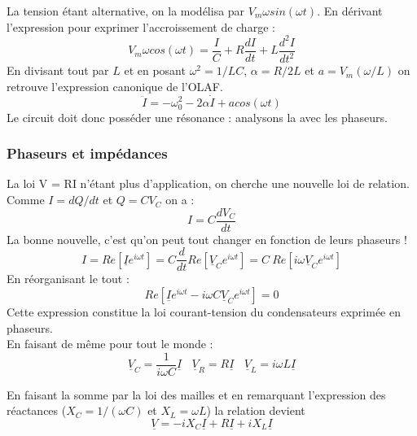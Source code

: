 \documentclass	[11pt, a4paper, openany]{book}
\begin{document}
	La tension étant alternative, on la modélisa par $V_m\omega sin(\omega t)$. En dérivant l'expression pour exprimer l'accroissement de charge : 
	\begin{equation}
		V_m\omega cos(\omega t) = \frac{I}{C} + R\frac{dI}{dt} + L\frac{d^2I}{dt^2}
	\end{equation}
	En divisant tout par $L$ et en posant $\omega^2 = 1/LC$, $\alpha = R/2L$ et $a = V_m(\omega/L)$ on retrouve l'expression canonique de l'OLAF.
	\begin{equation}
		\ddot{I} = -\omega_0^2 - 2\alpha\dot{I} + a cos(\omega t)
	\end{equation}
	Le circuit doit donc posséder une résonance : analysons la avec les phaseurs.
	
	\subsubsection{Phaseurs et impédances}
	La loi V = RI n'étant plus d'application, on cherche une nouvelle loi de relation. Comme $I = dQ/dt$ et $Q = CV_C$ on a :
	\begin{equation}
		I = C\frac{dV_C}{dt}
	\end{equation}
	La bonne nouvelle, c'est qu'on peut tout changer en fonction de leurs phaseurs ! 
	\begin{equation}
		I = Re\left[\underline{I}e^{i\omega t} \right] = C\frac{d}{dt}Re\left[\underline{V}_Ce^{i\omega t} \right] = C\ Re\left[i\omega\underline{V}_Ce^{i\omega t} \right]
	\end{equation}
	En réorganisant le tout :
	\begin{equation}
		Re\left[\underline{I}e^{i\omega t} - i\omega C\underline{V}_C e^{i\omega t} \right] = 0
	\end{equation}
	Cette expression constitue la loi courant-tension du condensateurs exprimée en phaseurs.\\
	
	En faisant de même pour tout le monde : 
	\begin{equation}
		\underline{V}_C = \frac{1}{i\omega C}\underline{I}\ \ \ \ \underline{V}_R = R\underline{I}\ \ \ \ \underline{V}_L = i\omega L\underline{I}
	\end{equation}
	
	En faisant la somme par la loi des mailles et en remarquant l'expression des réactances ($X_C = 1/(\omega C)$ et $X_L = \omega L$) la relation devient
	\begin{equation}
		\underline{V} = -iX_C\underline{I} + R\underline{I} + iX_L\underline{I}
	\end{equation}
	
\end{document}
